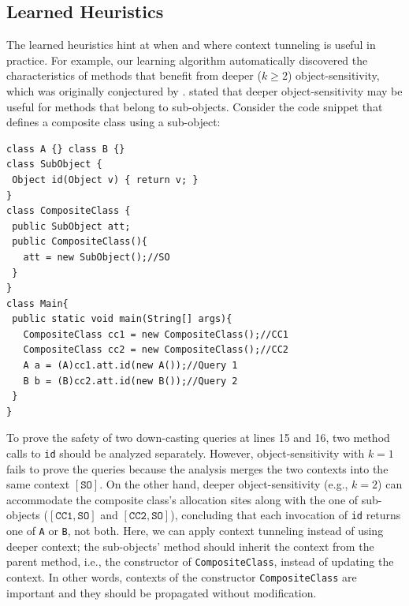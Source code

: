 \subsection{Learned Heuristics}\label{sec:tunneling:learnedHeuristics}
The learned heuristics hint at when
and where context tunneling is useful in practice.
For example, our learning algorithm automatically discovered the
characteristics of methods
that benefit from deeper ($k \ge 2$) object-sensitivity, which was
originally conjectured by \cite{Milanova2005}.
\cite{Milanova2005} stated that deeper object-sensitivity may be
useful for methods that belong to sub-objects.
Consider the code snippet %
that defines a composite class using a sub-object:
\begin{lstlisting}
class A {} class B {}
class SubObject {
 Object id(Object v) { return v; }
}
class CompositeClass {
 public SubObject att;
 public CompositeClass(){
   att = new SubObject();//SO
 }
}
class Main{
 public static void main(String[] args){
   CompositeClass cc1 = new CompositeClass();//CC1
   CompositeClass cc2 = new CompositeClass();//CC2
   A a = (A)cc1.att.id(new A());//Query 1
   B b = (B)cc2.att.id(new B());//Query 2
 }
}
\end{lstlisting}
To prove the safety of two down-casting queries at lines 15 and 16,
two method calls to {\tt id} should be analyzed separately.
However, object-sensitivity with $k=1$ fails to prove the queries
because the analysis merges the two contexts into the same context $[\texttt{SO}]$. On the other hand, deeper object-sensitivity (e.g., $k = 2$) can accommodate
the composite class's allocation sites along with the one of
sub-objects ($[\texttt{CC1}, \texttt{SO}]$ and $[\texttt{CC2},
\texttt{SO}]$), concluding that each invocation of \texttt{id} returns one of \texttt{A} or \texttt{B}, not both. Here, we can apply context tunneling instead of using deeper context; the
sub-objects' method should inherit the context from the parent method, i.e.,
the constructor of \texttt{CompositeClass}, instead of updating the
context. In other words, contexts of the constructor \texttt{CompositeClass} are {important} and they should be propagated without modification.
